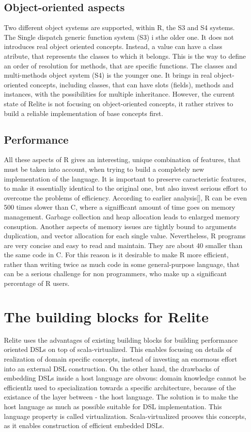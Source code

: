 \documentclass{sigplanconf}
\begin{document}
\subsection{Object-oriented aspects}
Two different object systems are supported, within R, the S3 and S4 systems. The Single dispatch generic function system (S3) i sthe older one. It does not introduces real object oriented concepts.
Instead, a value can have a class atribute, that represents the classes to which it belongs. This is the way to define an order of resolution for methods, that are specific functions. The classes 
and multi-methods object system (S4) is the younger one. It brings in real object-oriented concepts, including classes, that can have slots (fields), methods and instances, with the possibilities 
for multiple inheritance. However, the current state of Relite is not focusing on object-oriented concepts, it rather strives to build a reliable implementation of base concepts first.

\subsection{Performance}
All these aspects of R gives an interesting, unique combination of features, that must be taken into account, when trying to build a completely new implementation of the language. 
It is important to preserve caracteristic features, to make it essentially identical to the original one, but also invest serious effort to overcome the problems of efficiency.
According to earlier analysis[], R can be even 500 times slower than C, where a signifficant amount of time goes on memory management. Garbage collection and heap allocation leads to enlarged memory
consuption. Another aspects of memory issues are tightly bound to arguments duplication, and vector allocation for each single value. Nevertheless, R programs are very concise and easy to read and
maintain. They are about 40 smaller than the same code in C. For this reason is it desirable to make R more efficient, rather than writing twice as much code in some general-purpose language, that 
can be a serious challenge for non programmers, who make up a significant percentage of R users.

\section{The building blocks for Relite}
Relite uses the advantages of existing building blocks for building performance oriented DSLs on top of scala-virtualized. This enables focusing on details of realization of domain specific 
concepts, instead of investing an enormous effort into an external DSL construction. On the other hand, the drawbacks of embedding DSLs inside a host language are obvous: domain knowledge 
cannot be efficientlz used to specialization towards a specific architecture, because of the existance of the layer between - the host language. The solution is to make the host language
as much as possible suitable for DSL implementation. This language property is called virtualization. Scala-virtualized prooves this concepts, as it enables construction of efficient embedded DSLs.
\end{document}
